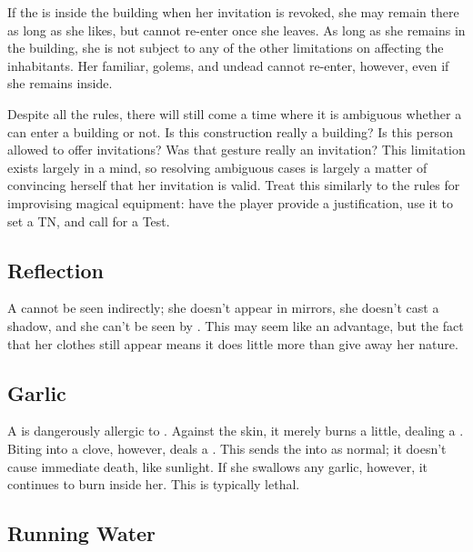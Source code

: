 If the {\vampire} is inside the building when her invitation is revoked, she may remain there as long as she likes, but cannot re-enter once she leaves.
As long as she remains in the building, she is not subject to any of the other limitations on affecting the inhabitants.
Her familiar, golems, and undead cannot re-enter, however, even if she remains inside.

Despite all the rules, there will still come a time where it is ambiguous whether a {\vampire} can enter a building or not.
Is this construction really a building?
Is this person allowed to offer invitations?
Was that gesture really an invitation?
This limitation exists largely in a {\vampirepossessive} mind, so resolving ambiguous cases is largely a matter of convincing herself that her invitation is valid.
Treat this similarly to the rules for improvising magical equipment: have the player provide a justification, use it to set a TN, and call for a  Test.

\subsection{Reflection}

A {\vampire} cannot be seen indirectly; she doesn't appear in mirrors, she doesn't cast a shadow, and she can't be seen by .
This may seem like an advantage, but the fact that her clothes still appear means it does little more than give away her {\vampiric} nature.

\subsection{Garlic}

A {\vampire} is dangerously allergic to .
Against the skin, it merely burns a little, dealing a  {\damagetest}.
Biting into a clove, however, deals a  {\damagetest}.
This {\damagetest} sends the {\vampire} into {\shock} as normal; it doesn't cause immediate death, like sunlight.
If she swallows any garlic, however, it continues to burn inside her.
This is typically lethal.

\subsection{Running Water}


